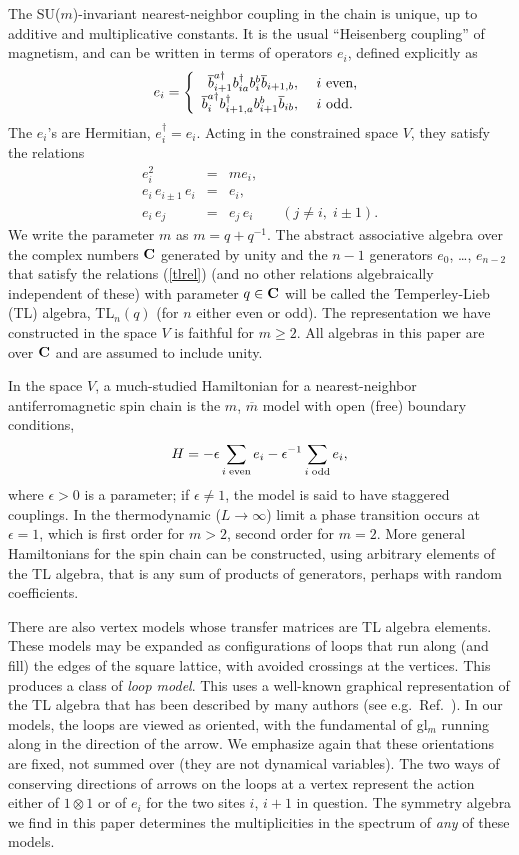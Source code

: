 \documentclass[twocolumn,floats,pra]{revtex4}
\newcommand {\be}{\begin{equation}}
\newcommand {\ee} {\end{equation}}
\newcommand {\bea}{\begin{eqnarray}}
\newcommand {\eea} {\end{eqnarray}}
\begin{document}
The SU($m$)-invariant nearest-neighbor coupling in the chain is
unique, up to additive and multiplicative constants. It is the
usual ``Heisenberg coupling'' of magnetism, and can be written in
terms of operators $e_i$, defined explicitly as %
\be e_i=\left\{\begin{array} {rl}
\overline{b}_{i+1}^{a\dagger}b_{ia}^\dagger
b_i^b \overline{b}_{i+1,b},&\hbox{ $i$ even,}\\
\overline{b}_i^{a\dagger}b_{i+1,a}^\dagger b_{i+1}^b
\overline{b}_{ib},&\hbox{ $i$ odd.}
\end{array}\right. \ee
The $e_i$'s are Hermitian, $e_i^\dagger=e_i$. Acting in the
constrained space $V$, they satisfy \cite{bb,affleck3} the
relations \cite{tl,baxter}
%
\bea e_i^2 &=& m e_i,\nonumber\\ e_i\, e_{i\pm 1}\, e_i &=&
e_i,\nonumber\\  e_i\,e_j&=&e_j\,e_i \qquad (j\neq i,\;i\pm 1).
\label{tlrel}
\eea %
We write the parameter $m$ as $m=q+q^{-1}$. The abstract
associative algebra over the complex numbers $\bf C$ generated by
unity and the $n-1$ generators $e_0$, \ldots, $e_{n-2}$ that
satisfy the relations (\ref{tlrel}) (and no other relations
algebraically independent of these) with parameter $q\in {\bf C}$
will be called the Temperley-Lieb (TL) algebra, TL$_{n}(q)$ (for
$n$ either even or odd). The representation we have constructed in
the space $V$ is faithful for $m\geq 2$. All algebras in this
paper are over $\bf C$ and are assumed to include unity.

In the space $V$, a much-studied Hamiltonian for a
nearest-neighbor antiferromagnetic spin chain is the $m$,
$\overline{m}$ model with open (free) boundary conditions,
%
\be H=-\epsilon\sum_{i\;{\rm even}}e_i -\epsilon^{-1}\sum_{i\;{\rm
odd}} e_i,\label{tlham} \ee%
where $\epsilon>0$ is a parameter; if $\epsilon \neq 1$, the model
is said to have staggered couplings. In the thermodynamic
($L\to\infty$) limit a phase transition occurs at $\epsilon=1$,
which is first order for $m>2$, second order for $m=2$. More
general Hamiltonians for the spin chain can be constructed, using
arbitrary elements of the TL algebra, that is any sum of products
of generators, perhaps with random coefficients.

There are also vertex models whose transfer matrices are TL
algebra elements. These models may be expanded as configurations
of loops that run along (and fill) the edges of the square
lattice, with avoided crossings at the vertices. This produces a
class of {\it loop model}. This uses a well-known graphical
representation of the TL algebra that has been described by many
authors (see e.g.\ Ref.\ \cite{baxter}). In our models, the loops
are viewed as oriented, with the fundamental of gl$_m$ running
along in the direction of the arrow. We emphasize again that these
orientations are fixed, not summed over (they are not dynamical
variables). The two ways of conserving directions of arrows on the
loops at a vertex represent the action either of $1\otimes 1$ or
of $e_i$ for the two sites $i$, $i+1$ in question. The symmetry
algebra we find in this paper determines the multiplicities in the
spectrum of {\em any} of these models.
\end{document}
